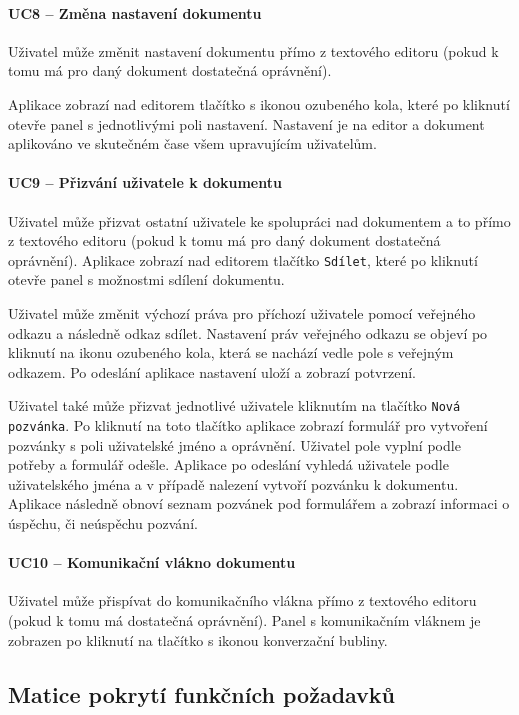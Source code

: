 \paragraph{UC8 -- Změna nastavení dokumentu}

Uživatel může změnit nastavení dokumentu přímo z textového editoru (pokud k tomu má pro daný dokument dostatečná oprávnění).

Aplikace zobrazí nad editorem tlačítko s ikonou ozubeného kola, které po kliknutí otevře panel s jednotlivými poli nastavení.
Nastavení je na editor a dokument aplikováno ve skutečném čase všem upravujícím uživatelům.


\paragraph{UC9 -- Přizvání uživatele k dokumentu}

Uživatel může přizvat ostatní uživatele ke spolupráci nad dokumentem a to přímo z textového editoru (pokud k tomu má pro daný dokument dostatečná oprávnění).
Aplikace zobrazí nad editorem tlačítko \texttt{Sdílet}, které po kliknutí otevře panel s možnostmi sdílení dokumentu.

Uživatel může změnit výchozí práva pro příchozí uživatele pomocí veřejného odkazu a následně odkaz sdílet.
Nastavení práv veřejného odkazu se objeví po kliknutí na ikonu ozubeného kola, která se nachází vedle pole s veřejným odkazem.
Po odeslání aplikace nastavení uloží a zobrazí potvrzení.

Uživatel také může přizvat jednotlivé uživatele kliknutím na tlačítko \texttt{Nová pozvánka}.
Po kliknutí na toto tlačítko aplikace zobrazí formulář pro vytvoření pozvánky s poli uživatelské jméno a oprávnění.
Uživatel pole vyplní podle potřeby a formulář odešle.
Aplikace po odeslání vyhledá uživatele podle uživatelského jména a v případě nalezení vytvoří pozvánku k dokumentu.
Aplikace následně obnoví seznam pozvánek pod formulářem a zobrazí informaci o úspěchu, či neúspěchu pozvání.

\paragraph{UC10 -- Komunikační vlákno dokumentu}

Uživatel může přispívat do komunikačního vlákna přímo z textového editoru (pokud k tomu má dostatečná oprávnění).
Panel s komunikačním vláknem je zobrazen po kliknutí na tlačítko s ikonou konverzační bubliny.

\subsection{Matice pokrytí funkčních požadavků}\label{subsec:maticePokrytíFunkčníchPožadavků}

